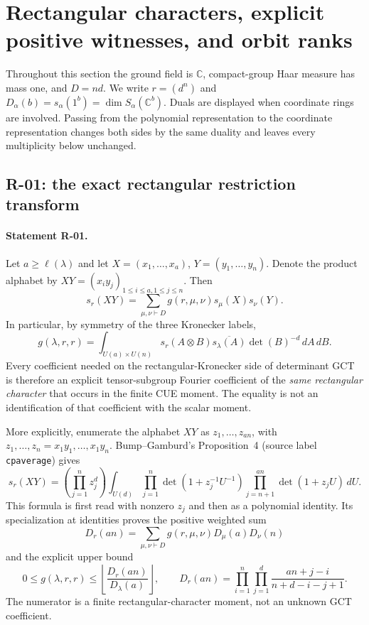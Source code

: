 \documentclass[11pt,a4paper]{article}
\theoremstyle{definition}\newtheorem{definition}{Definition}
\begin{document}
\section{Rectangular characters, explicit positive witnesses, and orbit ranks}

Throughout this section the ground field is $\mathbb C$, compact-group Haar
measure has mass one, and $D=nd$. We write $r=(d^n)$ and
$D_\alpha(b)=s_\alpha(1^b)=\dim S_\alpha(\mathbb C^b)$.
Duals are displayed when coordinate rings are involved. Passing from the
polynomial representation to the coordinate representation changes both sides
by the same duality and leaves every multiplicity below unchanged.

\subsection{R-01: the exact rectangular restriction transform}

\paragraph{Statement R-01.}
Let $a\geq\ell(\lambda)$ and let $X=(x_1,\ldots,x_a)$,
$Y=(y_1,\ldots,y_n)$. Denote the product alphabet by
$XY=(x_i y_j)_{1\leq i\leq a,1\leq j\leq n}$. Then
\begin{equation}\label{R01:branching}
 s_r(XY)=\sum_{\mu,\nu\vdash D}
 g(r,\mu,\nu)s_\mu(X)s_\nu(Y).
\end{equation}
In particular, by symmetry of the three Kronecker labels,
\begin{equation}\label{R01:haar}
 g(\lambda,r,r)=\int_{U(a)\times U(n)}
 s_r(A\otimes B)\overline{s_\lambda(A)}\det(B)^{-d}\,dA\,dB.
\end{equation}
Every coefficient needed on the rectangular-Kronecker side of determinant
GCT is therefore an explicit tensor-subgroup Fourier coefficient of the
\emph{same rectangular character} that occurs in the finite CUE moment.
The equality is not an identification of that coefficient with the scalar
moment.

More explicitly, enumerate the alphabet $XY$ as $z_1,\ldots,z_{an}$, with
$z_1,\ldots,z_n=x_1y_1,\ldots,x_1y_n$. Bump--Gamburd's Proposition~4
(source label \nolinkurl{cpaverage}) gives
\begin{equation}\label{R01:CUE}
 s_r(XY)=\left(\prod_{j=1}^n z_j^d\right)
 \int_{U(d)}\prod_{j=1}^n\det(1+z_j^{-1}U^{-1})
 \prod_{j=n+1}^{an}\det(1+z_jU)\,dU.
\end{equation}
This formula is first read with nonzero $z_j$ and then as a polynomial identity.
Its specialization at identities proves the positive weighted sum
\begin{equation}\label{R01:dimension}
 D_r(an)=\sum_{\mu,\nu\vdash D}
 g(r,\mu,\nu)D_\mu(a)D_\nu(n)
\end{equation}
and the explicit upper bound
\begin{equation}\label{R01:bound}
 0\leq g(\lambda,r,r)\leq
 \left\lfloor\frac{D_r(an)}{D_\lambda(a)}\right\rfloor,
 \qquad
 D_r(an)=\prod_{i=1}^{n}\prod_{j=1}^{d}
 \frac{an+j-i}{n+d-i-j+1}.
\end{equation}
The numerator is a finite rectangular-character moment, not an unknown GCT
coefficient.
\end{document}
